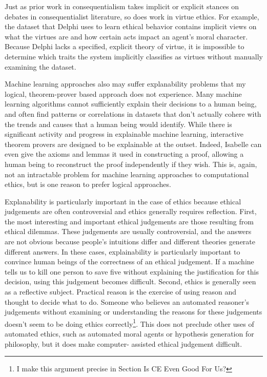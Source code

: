 \begin{isabellebody}
\begin{isamarkuptext}
Just as prior work in consequentialism takes implicit or explicit stances on debates in consequentialist
literature, so does work in virtue ethics. For example, the dataset that Delphi uses to learn ethical
behavior contains implicit views on what the virtues are and how certain acts impact an agent's
moral character. Because Delphi lacks a specified, explicit theory of virtue, it is impossible to 
determine which traits the system implicitly classifies as virtues without manually examining the 
dataset. 

Machine learning approaches also may suffer explanability problems that my logical, theorem-prover
based approach does not experience. Many machine learning algorithms cannot sufficiently explain their 
decisions to a human being, and often find patterns or correlations in datasets that don't actually 
cohere with the trends and causes that a human being would identify. While there is significant activity 
and progress in explainable machine learning, interactive theorem provers are designed to be explainable 
at the outset. Indeed, Isabelle can even give the axioms and lemmas it used in constructing a proof, 
allowing a human being to reconstruct the proof independently if they wish. This is, again, not an 
intractable problem for machine learning approaches to computational ethics, but is one reason to 
prefer logical approaches.

Explanability is particularly important in the case of ethics because ethical judgements are often 
controversial and ethics generally requires reflection. First, the most interesting and important
ethical judgements are those resulting from ethical dilemmas. These judgements are usually controversial, 
and the answers are not obvious because people's intuitions differ and different theories generate
different answers. In these cases, explainability is particularly important to convince human beings 
of the correctness of an ethical judgement. If a machine tells us to kill one person to save five without
explaining the justification for this decision, using this judgement becomes difficult. Second, ethics
is generally seen as a reflective subject. Practical reason is the exercise of using reason and thought
to decide what to do. Someone who believes an automated reasoner's judgements without examining or 
understanding the reasons for these judgements doesn't seem to be doing ethics correctly\footnote{I make
this argument precise in Section Is CE Even Good For Us?}. This does not preclude other uses of automated
ethics, such as automated moral agents or hypothesis generation for philosophy, but it does make computer-
assisted ethical judgement difficult.%
\end{isamarkuptext}\isamarkuptrue%
%
\isadelimtheory
%
\endisadelimtheory
%
\isatagtheory
%
\endisatagtheory
{\isafoldtheory}%
%
\isadelimtheory
%
\endisadelimtheory
%
\end{isabellebody}%
